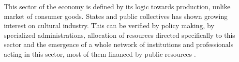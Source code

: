 \documentclass[a4paper, 12pt, openright, oneside, german, french, brazil, english, article]{abntex2}
\begin{document}
	
	This sector of the economy is defined by its logic towards production, unlike market of consumer goods. States and public collectives has shown growing interest on cultural industry. This can be verified by policy making, by specialized administrations, allocation of resources directed specifically to this sector and the emergence of a whole network of institutions and professionals acting in this sector, most of them financed by public resources \cite{tolila2007cultura}.



	
\end{document}
